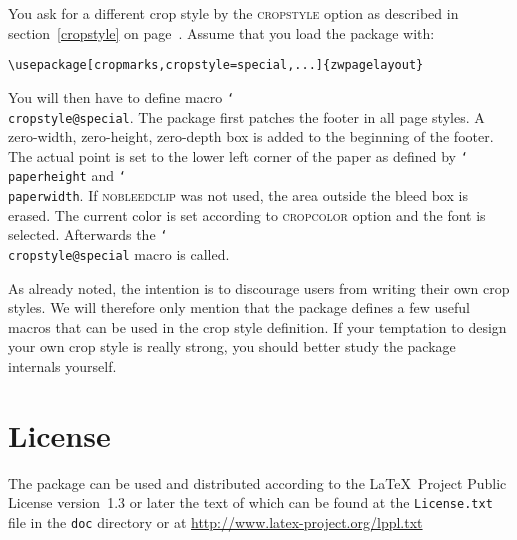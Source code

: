 \documentclass[11pt]{article}
\def\mg#1{\ifvmode\leavevmode\fi\marginpar{\texttt{#1}}\ignorespaces}
\def\cmg#1{\mg{\char`\\#1}}
\def\opt#1{\texorpdfstring{\textmd{\textsc{#1}}}{#1}}
\DeclareRobustCommand\cmd[1]{\texttt{\char`\\#1}}
\begin{document}
You ask for a different crop style by the \opt{cropstyle} option as described in
section~\ref{cropstyle} on page~\pageref{cropstyle}. Assume that you load the package with:

\medskip
\begin{verbatim}
\usepackage[cropmarks,cropstyle=special,...]{zwpagelayout}
\end{verbatim}

\cmg{cropstyle@special}
You will then have to define macro \cmd{cropstyle@special}. The package first patches the footer in
all page styles. A zero-width, zero-height, zero-depth box is added to the beginning of the footer.
The actual point is set to the lower left corner of the paper as defined by \cmd{paperheight} and
\cmd{paperwidth}. If \opt{nobleedclip} was not used, the area outside the bleed box is erased. The
current color is set according to \opt{cropcolor} option and the font is selected. Afterwards the
\cmd{cropstyle@special} macro is called.

As already noted, the intention is to discourage users from writing their own crop styles. We will
therefore only mention that the package defines a few useful macros that can be used in the crop
style definition. If your temptation to design your own crop style is really strong, you should
better study the package internals yourself.

\enlargethispage*{2in}

\section{License}
The package can be used and distributed according to the \LaTeX\ Project Public License version~1.3 or later the
text of which can be found at the \texttt{License.txt} file in the \texttt{doc} directory or at
\url{http://www.latex-project.org/lppl.txt}
\end{document}
